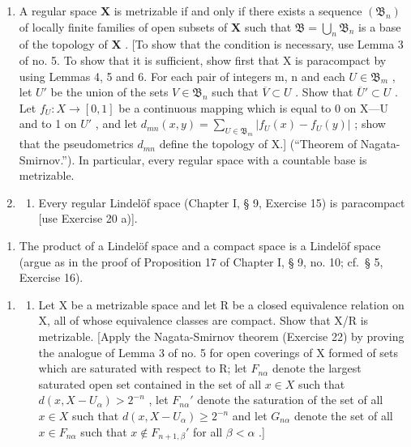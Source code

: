 \begin{enumerate}
\def\labelenumi{\arabic{enumi})}
\setcounter{enumi}{21}
\item
  A regular space \(\mathbf{X}\) is metrizable if and only if there exists a sequence \((\mathfrak{B}_n)\) of locally finite families of open subsets of \(\mathbf{X}\) such that \(\mathfrak{B} = \bigcup_{n} \mathfrak{B}_n\) is a base of the topology of \(\mathbf{X}\) . {[}To show that the condition is necessary, use Lemma 3 of no. 5. To show that it is sufficient, show first that X is paracompact by using Lemmas 4, 5 and 6. For each pair of integers m, n and each \(U \in \mathfrak{B}_{m}\) , let \(U'\) be the union of the sets \(V \in \mathfrak{B}_{n}\) such that \(\overline{V} \subset U\) . Show that \(\overline{U}' \subset U\) . Let \(f_{U}: X \to [0, 1]\) be a continuous mapping which is equal to 0 on X---U and to 1 on \(U'\) , and let \(d_{mn}(x, y) = \sum_{U \in \mathfrak{B}_{m}} |f_{U}(x) - f_{U}(y)|\) ; show that the pseudometrics \(d_{mn}\) define the topology of X.{]} (``Theorem of Nagata-Smirnov.''). In particular, every regular space with a countable base is metrizable.
\item
  \begin{enumerate}
  \def\labelenumii{\alph{enumii})}
  \tightlist
  \item
    Every regular Lindelöf space (Chapter I, § 9, Exercise 15) is paracompact {[}use Exercise 20 a){]}.
  \end{enumerate}
\end{enumerate}

\begin{enumerate}
\def\labelenumi{\alph{enumi})}
\setcounter{enumi}{1}
\tightlist
\item
  The product of a Lindelöf space and a compact space is a Lindelöf space (argue as in the proof of Proposition 17 of Chapter I, § 9, no. 10; cf.~§ 5, Exercise 16).
\end{enumerate}

\begin{enumerate}
\def\labelenumi{\arabic{enumi})}
\setcounter{enumi}{23}
\tightlist
\item
  \begin{enumerate}
  \def\labelenumii{\alph{enumii})}
  \tightlist
  \item
    Let X be a metrizable space and let R be a closed equivalence relation on X, all of whose equivalence classes are compact. Show that X/R is metrizable. {[}Apply the Nagata-Smirnov theorem (Exercise 22) by proving the analogue of Lemma 3 of no. 5 for open coverings of X formed of sets which are saturated with respect to R; let \(F_{n\alpha}\) denote the largest saturated open set contained in the set of all \(x \in X\) such that \(d(x, X - U_{\alpha}) > 2^{-n}\) , let \(F_{n\alpha}'\) denote the saturation of the set of all \(x \in X\) such that \(d(x, X - U_{\alpha}) \geqslant 2^{-n}\) and let \(G_{n\alpha}\) denote the set of all \(x \in F_{n\alpha}\) such that \(x \notin F_{n+1,\beta}'\) for all \(\beta < \alpha\) .{]}
  \end{enumerate}
\end{enumerate}

